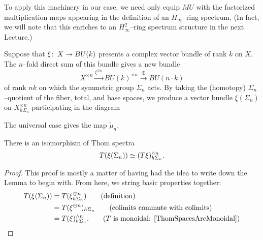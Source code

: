 To apply this machinery in our case, we need only equip \(MU\) with the factorized multiplication maps appearing in the definition of an \(H_\infty\)--ring spectrum.  (In fact, we will note that this enriches to an  \(H_\infty^2\)--ring spectrum structure in the next Lecture.)

\begin{definition}\label{DefnAssociatedBundle}
Suppose that \(\xi\colon\thinspace X \to BU(k)\) presents a complex vector bundle of rank \(k\) on \(X\).  The \(n\)--fold direct sum of this bundle gives a new bundle \[X^{\times n} \xrightarrow{\xi^{\oplus n}} BU(k)^{\times n} \xrightarrow{\oplus} BU(n \cdot k)\] of rank \(nk\) on which the symmetric group \(\Sigma_n\) acts.  By taking the (homotopy) \(\Sigma_n\)--quotient of the fiber, total, and base spaces, we produce a vector bundle \(\xi(\Sigma_n)\) on \(X^{\times n}_{h\Sigma_n}\) participating in the diagram
\begin{center}
\end{center}
The universal case gives the map \(\widetilde \mu_n\).
\end{definition}

\begin{lemma}\label{ThomSpectrumOfAssocBundle}
There is an isomorphism of Thom spectra \[T(\xi(\Sigma_n)) \simeq (T\xi)^{\wedge n}_{h\Sigma_n}.\]
\end{lemma}
\begin{proof}
This proof is mostly a matter of having had the idea to write down the Lemma to begin with.  From here, we string basic properties together:
\begin{align*}
T(\xi(\Sigma_n)) & = T(\xi^{\oplus n}_{h\Sigma_n}) \tag{definition} \\
& = T(\xi^{\oplus n})_{h\Sigma_n} \tag{colimits commute with colimits} \\
& = T(\xi)^{\sm n}_{h\Sigma_n}. \tag{\(T\) is monoidal: \Cref{ThomSpacesAreMonoidal}}
\end{align*}
\end{proof}

